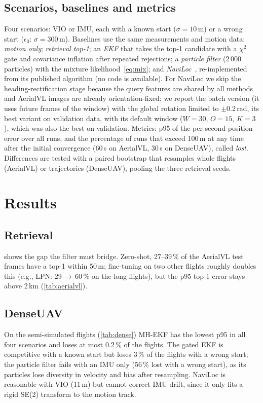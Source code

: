 \documentclass[journal]{IEEEtran}
\begin{document}
\subsection{Scenarios, baselines and metrics}
Four scenarios: VIO or IMU, each with a known start ($\sigma=10$\,m) or a wrong start ($\epsilon_0$: $\sigma=300$\,m).
Baselines use the same measurements and motion data: \emph{motion only}; \emph{retrieval top-1}; an \emph{EKF} that
takes the top-1 candidate with a $\chi^2$ gate and covariance inflation after repeated rejections; a \emph{particle
filter} (2\,000 particles) with the mixture likelihood~\eqref{eq:mix}; and \emph{NaviLoc}~\cite{shpagin2026naviloc},
re-implemented from its published algorithm (no code is available). For NaviLoc we skip the heading-rectification stage
because the query features are shared by all methods and AerialVL images are already orientation-fixed; we report the
batch version (it uses future frames of the window) with the global rotation limited to $\pm0.2$\,rad, its best variant
on validation data, with its default window ($W=30$, $O=15$, $K=3$), which was also the best on validation.
Metrics: p95 of the per-second position error over all runs, and the percentage of runs that exceed 100\,m at any time
after the initial convergence (60\,s on AerialVL, 30\,s on DenseUAV), called \emph{lost}. Differences are tested with a
paired bootstrap that resamples whole flights (AerialVL) or trajectories (DenseUAV), pooling the three retrieval seeds.

\section{Results}\label{sec:results}




\subsection{Retrieval}
 shows the gap the filter must bridge. Zero-shot, 27--39\,\% of the AerialVL test frames have a
top-1 within 50\,m; fine-tuning on two other flights roughly doubles this (e.g., LPN: 29\,$\rightarrow$\,60\,\% on the
long flights), but the p95 top-1 error stays above 2\,km (\cref{tab:aerialvl}).

\subsection{DenseUAV}
On the semi-simulated flights (\cref{tab:dense}) MH-EKF has the lowest p95 in all four scenarios and loses at most
0.2\,\% of the flights. The gated EKF is competitive with a known start but loses 3\,\% of the flights with a wrong
start; the particle filter fails with an IMU only (56\,\% lost with a wrong start), as its particles lose diversity in
velocity and bias after resampling. NaviLoc is reasonable with VIO (11\,m) but cannot correct IMU drift, since it only
fits a rigid SE(2) transform to the motion track.
\end{document}
